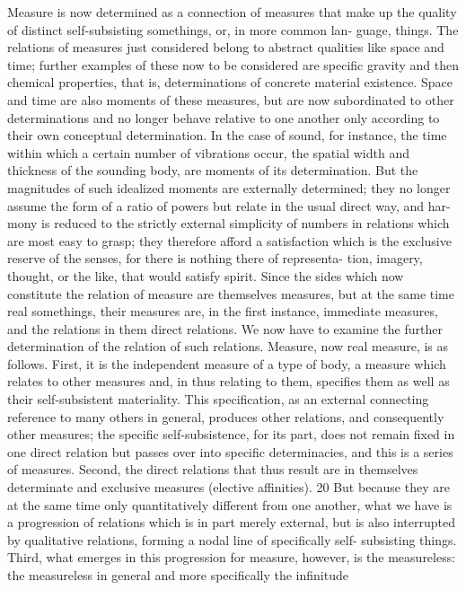 Measure is now determined as a connection of measures that make up the
quality of distinct self-subsisting somethings, or, in more common lan-
guage, things. The relations of measures just considered belong to abstract
qualities like space and time; further examples of these now to be considered
are specific gravity and then chemical properties, that is, determinations
of concrete material existence. Space and time are also moments of these
measures, but are now subordinated to other determinations and no longer
behave relative to one another only according to their own conceptual
determination. In the case of sound, for instance, the time within which a
certain number of vibrations occur, the spatial width and thickness of the
sounding body, are moments of its determination. But the magnitudes of
such idealized moments are externally determined; they no longer assume
the form of a ratio of powers but relate in the usual direct way, and har-
mony is reduced to the strictly external simplicity of numbers in relations
which are most easy to grasp; they therefore afford a satisfaction which is
the exclusive reserve of the senses, for there is nothing there of representa-
tion, imagery, thought, or the like, that would satisfy spirit. Since the sides
which now constitute the relation of measure are themselves measures, but
at the same time real somethings, their measures are, in the first instance,
immediate measures, and the relations in them direct relations. We now
have to examine the further determination of the relation of such relations.
Measure, now real measure, is as follows.
First, it is the independent measure of a type of body, a measure which
relates to other measures and, in thus relating to them, specifies them as
well as their self-subsistent materiality. This specification, as an external
connecting reference to many others in general, produces other relations,
and consequently other measures; the specific self-subsistence, for its part,
does not remain fixed in one direct relation but passes over into specific
determinacies, and this is a series of measures.
Second, the direct relations that thus result are in themselves determinate
and exclusive measures (elective affinities). 20 But because they are at the
same time only quantitatively different from one another, what we have
is a progression of relations which is in part merely external, but is also
interrupted by qualitative relations, forming a nodal line of specifically self-
subsisting things.
Third, what emerges in this progression for measure, however, is the
measureless: the measureless in general and more specifically the infinitude
